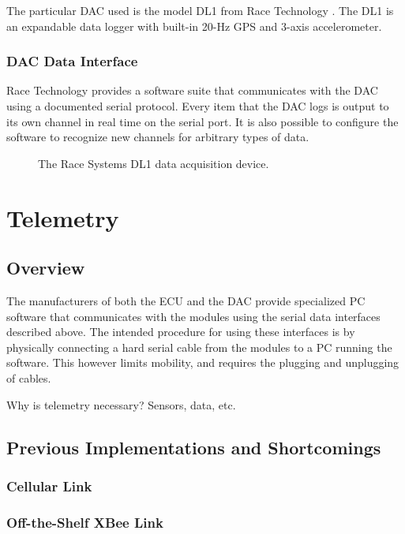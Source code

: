 The particular DAC used is the model DL1 from Race Technology \cite{DL1Dsheet}. The DL1 is an expandable data logger with built-in 20-Hz GPS and 3-axis accelerometer.

\subsubsection{DAC Data Interface\label{sec:background_dac_data_interface}}

Race Technology provides a software suite that communicates with the DAC using a documented serial protocol. Every item that the DAC logs is output to its own channel in real time on the serial port. It is also possible to configure the software to recognize new channels for arbitrary types of data.

\begin{figure}[H]
\centering
\caption{The Race Systems DL1 data acquisition device.}
\label{fig:dl1_product}
\end{figure}


\section{Telemetry}

\subsection{Overview}

The manufacturers of both the ECU and the DAC provide specialized PC software that communicates with the modules using the serial data interfaces described above. The intended procedure for using these interfaces is by physically connecting a hard serial cable from the modules to a PC running the software. This however limits mobility, and requires the plugging and unplugging of cables.

Why is telemetry necessary? Sensors, data, etc.

\subsection{Previous Implementations and Shortcomings}


\subsubsection{Cellular Link}


\subsubsection{Off-the-Shelf XBee Link}


